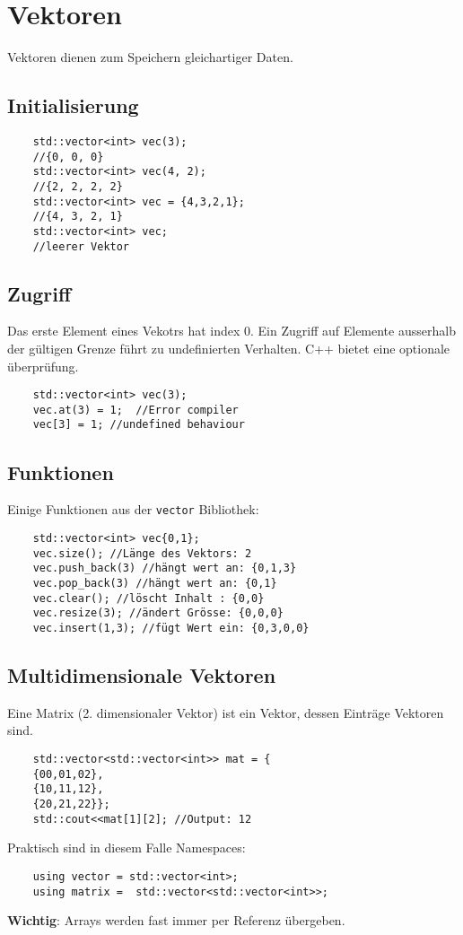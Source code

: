 \section{Vektoren} 
Vektoren dienen zum Speichern gleichartiger Daten.
\subsection{Initialisierung}
\begin{lstlisting}
	std::vector<int> vec(3);
	//{0, 0, 0}
	std::vector<int> vec(4, 2);
	//{2, 2, 2, 2}
	std::vector<int> vec = {4,3,2,1};
	//{4, 3, 2, 1}
	std::vector<int> vec;
	//leerer Vektor
\end{lstlisting}
\subsection{Zugriff}
Das erste Element eines Vekotrs hat index 0. Ein Zugriff auf Elemente ausserhalb der gültigen Grenze führt zu undefinierten Verhalten. C++ bietet eine optionale überprüfung.
\begin{lstlisting}
	std::vector<int> vec(3);
	vec.at(3) = 1;	//Error compiler
	vec[3] = 1; //undefined behaviour
\end{lstlisting}
\subsection{Funktionen}
Einige Funktionen aus der \texttt{vector} Bibliothek:
\begin{lstlisting}
	std::vector<int> vec{0,1};
	vec.size(); //Länge des Vektors: 2
	vec.push_back(3) //hängt wert an: {0,1,3}
	vec.pop_back(3) //hängt wert an: {0,1}
	vec.clear(); //löscht Inhalt : {0,0}
	vec.resize(3); //ändert Grösse: {0,0,0}
	vec.insert(1,3); //fügt Wert ein: {0,3,0,0}
\end{lstlisting}
\subsection{Multidimensionale Vektoren}
Eine Matrix (2. dimensionaler Vektor) ist ein Vektor, dessen Einträge Vektoren sind.
\begin{lstlisting}
	std::vector<std::vector<int>> mat = {
	{00,01,02},
	{10,11,12},
	{20,21,22}};
	std::cout<<mat[1][2]; //Output: 12
\end{lstlisting}
Praktisch sind in diesem Falle Namespaces:
\begin{lstlisting}
	using vector = std::vector<int>;
	using matrix = 	std::vector<std::vector<int>>;
\end{lstlisting}
\textbf{Wichtig}: Arrays werden fast immer per Referenz übergeben.




